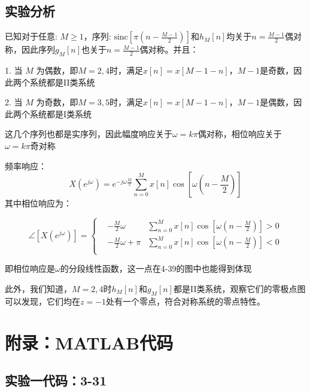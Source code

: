 \documentclass[UTF8,12pt,a4paper]{ctexart}
\begin{document}
\subsection{实验分析}

已知对于任意: $M \geq 1$，序列: $\text{sinc}[\pi(n - \frac{M-1}{2})]$和$h_{M}[n]$均关于$n=\frac{M-1}{2}$偶对称，因此序列$g_{M}[n]$也关于$n=\frac{M-1}{2}$偶对称。并且：

1. 当 $M$ 为偶数，即$M=2,4$时，满足$x[n] = x[M-1-n]$，$M-1$是奇数，因此两个系统都是II类系统

2. 当 $M$ 为奇数，即$M=3,5$时，满足$x[n] = x[M-1-n]$，$M-1$是偶数，因此两个系统都是I类系统

这几个序列也都是实序列，因此幅度响应关于$\omega = k\pi$偶对称，相位响应关于$\omega = k\pi$奇对称

频率响应：
$$X(e^{j\omega})=e^{-j\omega\frac{M}{2}}\sum_{n=0}^{M}x[n]\cos[\omega(n-\frac{M}{2})]$$
其中相位响应为：

$$
\angle [X(e^{j\omega})] = \left\{
\begin{aligned}
& -\frac{M}{2}\omega & \sum_{n=0}^{M}x[n]\cos[\omega(n-\frac{M}{2})] > 0 \\
&  -\frac{M}{2}\omega + \pi & \sum_{n=0}^{M}x[n]\cos[\omega(n-\frac{M}{2})] < 0\\
\end{aligned}
\right.
$$

即相位响应是$\omega$的分段线性函数，这一点在4-39的图中也能得到体现

此外，我们知道，$M=2, 4$时$h_M[n]$和$g_M[n]$都是II类系统，观察它们的零极点图可以发现，它们均在$z=-1$处有一个零点，符合对称系统的零点特性。

\newpage
\section{附录：MATLAB代码}

\subsection{实验一代码：3-31}
\end{document}
